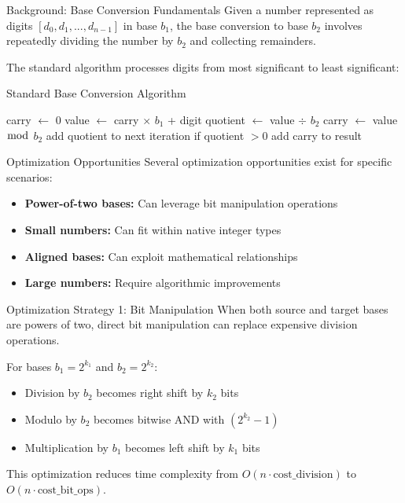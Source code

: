 \documentclass[10pt]{beamer}
\begin{document}
\begin{frame}{Background: Base Conversion Fundamentals}
Given a number represented as digits $[d_0, d_1, ..., d_{n-1}]$ in base $b_1$, the base conversion to base $b_2$ involves repeatedly dividing the number by $b_2$ and collecting remainders.

\vspace{0.3cm}
The standard algorithm processes digits from most significant to least significant:
\end{frame}

\begin{frame}{Standard Base Conversion Algorithm}
\begin{algorithm}[H]
\caption{Standard Base Conversion}
\begin{algorithmic}[1]
  \STATE carry $\gets$ 0
    \STATE value $\gets$ carry $\times$ $b_1$ + digit
    \STATE quotient $\gets$ value $\div$ $b_2$     \STATE carry $\gets$ value $\bmod$ $b_2$     \STATE add quotient to next iteration if quotient $> 0$   \ENDFOR
  \STATE add carry to result
\ENDWHILE
\end{algorithmic}
\end{algorithm}
\end{frame}

\begin{frame}{Optimization Opportunities}
Several optimization opportunities exist for specific scenarios:
\begin{itemize}
\item \textbf{Power-of-two bases:} Can leverage bit manipulation operations
\item \textbf{Small numbers:} Can fit within native integer types
\item \textbf{Aligned bases:} Can exploit mathematical relationships
\item \textbf{Large numbers:} Require algorithmic improvements
\end{itemize}
\end{frame}

\begin{frame}{Optimization Strategy 1: Bit Manipulation}
When both source and target bases are powers of two, direct bit manipulation can replace expensive division operations.

\vspace{0.3cm}
For bases $b_1 = 2^{k_1}$ and $b_2 = 2^{k_2}$:
\begin{itemize}
\item Division by $b_2$ becomes right shift by $k_2$ bits
\item Modulo by $b_2$ becomes bitwise AND with $(2^{k_2} - 1)$ \item Multiplication by $b_1$ becomes left shift by $k_1$ bits
\end{itemize}

\vspace{0.3cm}
This optimization reduces time complexity from $O(n \cdot \text{cost\_division})$ to $O(n \cdot \text{cost\_bit\_ops})$.
\end{frame}
\end{document}
